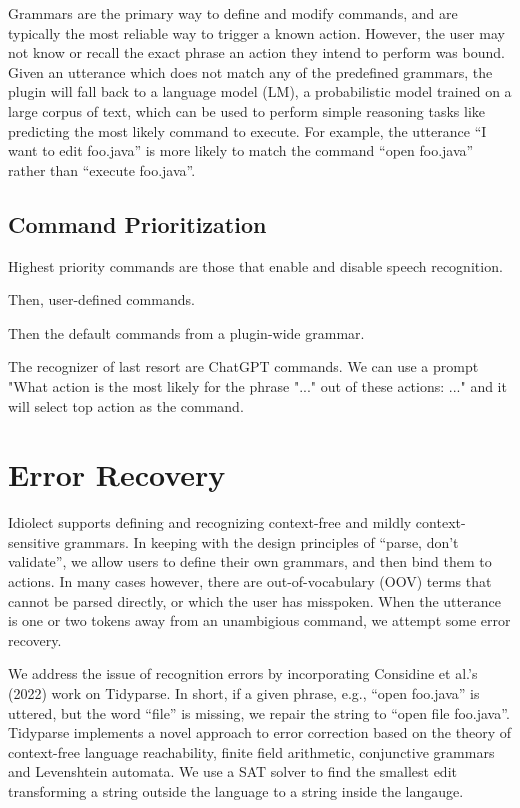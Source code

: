 \documentclass[conference]{IEEEtran}
\begin{document}
Grammars are the primary way to define and modify commands, and are typically the most reliable way to trigger a known action. However, the user may not know or recall the exact phrase an action they intend to perform was bound. Given an utterance which does not match any of the predefined grammars, the plugin will fall back to a language model (LM), a probabilistic model trained on a large corpus of text, which can be used to perform simple reasoning tasks like predicting the most likely command to execute. For example, the utterance ``I want to edit foo.java'' is more likely to match the command ``open foo.java'' rather than ``execute foo.java''.

\subsection{Command Prioritization}

Highest priority commands are those that enable and disable speech recognition.

Then, user-defined commands.

Then the default commands from a plugin-wide grammar.

The recognizer of last resort are ChatGPT commands. We can use a prompt "What action is the most likely for the phrase "..." out of these actions: ..." and it will select top action as the command.

\section{Error Recovery}

Idiolect supports defining and recognizing context-free and mildly context-sensitive grammars. In keeping with the design principles of ``parse, don't validate'', we allow users to define their own grammars, and then bind them to actions. In many cases however, there are out-of-vocabulary (OOV) terms that cannot be parsed directly, or which the user has misspoken. When the utterance is one or two tokens away from an unambigious command, we attempt some error recovery.

We address the issue of recognition errors by incorporating Considine et al.'s (2022) work on Tidyparse. In short, if a given phrase, e.g., ``open foo.java'' is uttered, but the word ``file'' is missing, we repair the string to ``open file foo.java''. Tidyparse implements a novel approach to error correction based on the theory of context-free language reachability, finite field arithmetic, conjunctive grammars and Levenshtein automata. We use a SAT solver to find the smallest edit transforming a string outside the language to a string inside the langauge.
\end{document}
